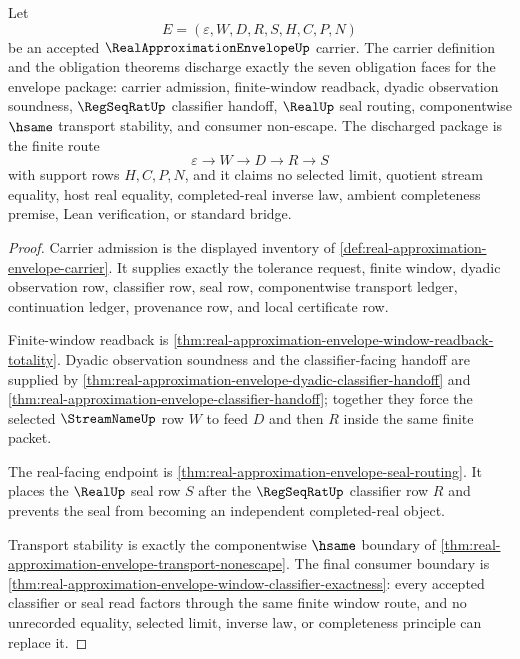 \begin{theorem}
\label{thm:real-approximation-envelope-obligation-coverage}
Let
$$
E=(\varepsilon,W,D,R,S,H,C,P,N)
$$
be an accepted $\RealApproximationEnvelopeUp$ carrier. The carrier definition and the obligation theorems discharge exactly the seven obligation faces for the envelope package: carrier admission, finite-window readback, dyadic observation soundness, $\RegSeqRatUp$ classifier handoff, $\RealUp$ seal routing, componentwise $\hsame$ transport stability, and consumer non-escape. The discharged package is the finite route
$$
\varepsilon \longrightarrow W \longrightarrow D \longrightarrow R \longrightarrow S
$$
with support rows $H,C,P,N$, and it claims no selected limit, quotient stream equality, host real equality, completed-real inverse law, ambient completeness premise, Lean verification, or standard bridge.
\end{theorem}
\begin{proof}
Carrier admission is the displayed inventory of \autoref{def:real-approximation-envelope-carrier}. It supplies exactly the tolerance request, finite window, dyadic observation row, classifier row, seal row, componentwise transport ledger, continuation ledger, provenance row, and local certificate row.

Finite-window readback is \autoref{thm:real-approximation-envelope-window-readback-totality}. Dyadic observation soundness and the classifier-facing handoff are supplied by \autoref{thm:real-approximation-envelope-dyadic-classifier-handoff} and \autoref{thm:real-approximation-envelope-classifier-handoff}; together they force the selected $\StreamNameUp$ row $W$ to feed $D$ and then $R$ inside the same finite packet.

The real-facing endpoint is \autoref{thm:real-approximation-envelope-seal-routing}. It places the $\RealUp$ seal row $S$ after the $\RegSeqRatUp$ classifier row $R$ and prevents the seal from becoming an independent completed-real object.

Transport stability is exactly the componentwise $\hsame$ boundary of \autoref{thm:real-approximation-envelope-transport-nonescape}. The final consumer boundary is \autoref{thm:real-approximation-envelope-window-classifier-exactness}: every accepted classifier or seal read factors through the same finite window route, and no unrecorded equality, selected limit, inverse law, or completeness principle can replace it.
\end{proof}

